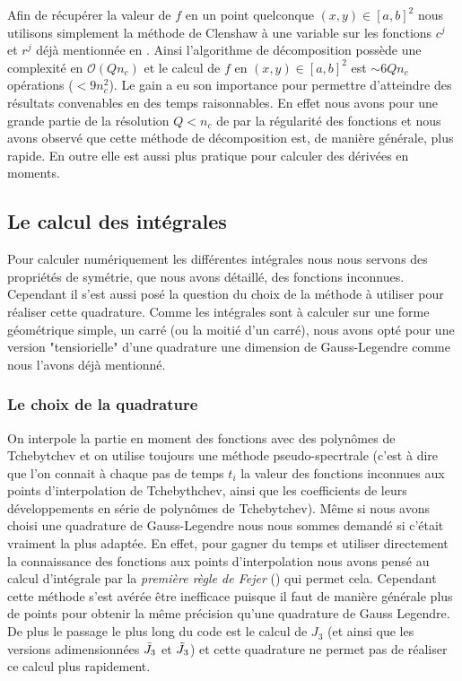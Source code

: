 \documentclass[10.5pt]{article}
\begin{document}
\begin{multicols}{2}
Afin de récupérer la valeur de $f$ en un point quelconque $(x,y) \in [a,b]^2 $ nous utilisons simplement la méthode de Clenshaw à une variable sur les fonctions $c^j$ et $r^j$ déjà mentionnée en . Ainsi l'algorithme de décomposition possède une complexité en $\mathcal{O}(Q n_c)$ et le calcul de $f$ en $(x,y) \in [a,b]^2$ est $\sim 6Qn_c$ opérations ($< 9n_c^2$). Le gain a eu son importance pour permettre d'atteindre des résultats convenables en des temps raisonnables. En effet nous avons pour une grande partie de la résolution $Q < n_c$ de par la régularité des fonctions et nous avons observé que cette méthode de décomposition est, de manière générale, plus rapide. En outre elle est aussi plus pratique pour calculer des dérivées en moments. \\



\subsection{Le calcul des intégrales} 

Pour calculer numériquement les différentes intégrales nous nous servons des propriétés de symétrie, que nous avons détaillé, des fonctions inconnues. Cependant il s'est aussi posé la question du choix de la méthode à utiliser pour réaliser cette quadrature. Comme les intégrales sont à calculer sur une forme géométrique simple, un carré (ou la moitié d'un carré), nous avons opté pour une version "tensiorielle" d'une quadrature une dimension de Gauss-Legendre comme nous l'avons déjà mentionné. 


\subsubsection{Le choix de la quadrature}

On interpole la partie en moment des fonctions avec des polynômes de Tchebytchev et on utilise toujours une méthode pseudo-specrtrale (c'est à dire que l'on connait à chaque pas de temps $t_i$ la valeur des fonctions inconnues aux points d'interpolation de Tchebythchev, ainsi que les coefficients de leurs développements en série de polynômes de Tchebytchev). Même si nous avons choisi une quadrature de Gauss-Legendre nous nous sommes demandé si c'était vraiment la plus adaptée. En effet, pour gagner du temps et utiliser directement la connaissance des fonctions aux points d'interpolation nous avons pensé au calcul d'intégrale par la \emph{première règle de Fejer} \cite{waldvogel2006fast} () qui permet cela.
 Cependant cette méthode s'est avérée être inefficace puisque il faut de manière générale plus de points pour obtenir la même précision qu'une quadrature de Gauss Legendre. De plus le passage le plus long du code est le calcul de $J_3$ (et ainsi que les versions adimensionnées $\bar{J}_3$ et $\tilde{J}_3$) et cette quadrature ne permet pas de réaliser ce calcul plus rapidement.



\end{multicols}
\end{document}
